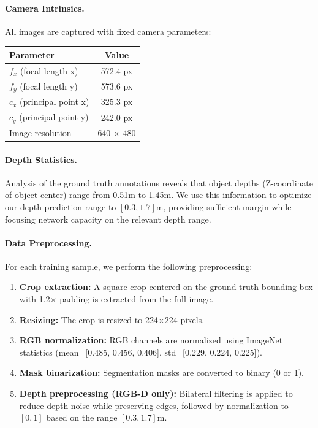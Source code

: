 \paragraph{Camera Intrinsics.}
All images are captured with fixed camera parameters:
\begin{center}
\begin{tabular}{l|c}
\textbf{Parameter} & \textbf{Value} \\
\hline
$f_x$ (focal length x) & 572.4 px \\
$f_y$ (focal length y) & 573.6 px \\
$c_x$ (principal point x) & 325.3 px \\
$c_y$ (principal point y) & 242.0 px \\
Image resolution & 640 $\times$ 480 \\
\end{tabular}
\end{center}

\paragraph{Depth Statistics.}
Analysis of the ground truth annotations reveals that object depths (Z-coordinate of object center) range from 0.51m to 1.45m. We use this information to optimize our depth prediction range to $[0.3, 1.7]$m, providing sufficient margin while focusing network capacity on the relevant depth range.

\paragraph{Data Preprocessing.}
For each training sample, we perform the following preprocessing:
\begin{enumerate}
    \item \textbf{Crop extraction:} A square crop centered on the ground truth bounding box with 1.2$\times$ padding is extracted from the full image.
    \item \textbf{Resizing:} The crop is resized to 224$\times$224 pixels.
    \item \textbf{RGB normalization:} RGB channels are normalized using ImageNet statistics (mean=[0.485, 0.456, 0.406], std=[0.229, 0.224, 0.225]).
    \item \textbf{Mask binarization:} Segmentation masks are converted to binary (0 or 1).
    \item \textbf{Depth preprocessing (RGB-D only):} Bilateral filtering is applied to reduce depth noise while preserving edges, followed by normalization to $[0,1]$ based on the range $[0.3, 1.7]$m.
\end{enumerate}
